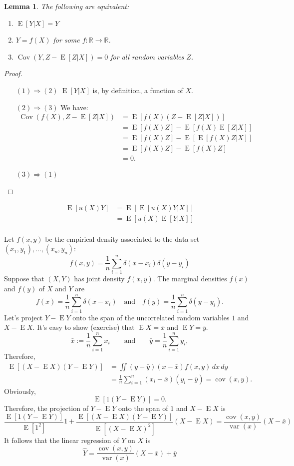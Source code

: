\documentclass[12pt]{amsart}
\renewcommand{\hat}{\widehat}
\newcommand{\RR}{\mathbb{R}}
\DeclareMathOperator{\EE}{E}
\DeclareMathOperator{\Cov}{Cov}
\DeclareMathOperator{\cov}{cov}
\DeclareMathOperator{\var}{var}
\newtheorem{lemma}[theorem]{Lemma}
\begin{document}
\begin{lemma}
    The following are equivalent:
    \begin{enumerate}
        \setlength{\itemsep}{1em}
        \item $\EE[Y|X]=Y$
        \item $Y=f(X)$ for some $f:\RR\to\RR$.
        \item $\Cov(Y, Z-\EE[Z|X])=0$ for all random variables $Z$.
    \end{enumerate}
\end{lemma}
\begin{proof}\hfill
    \begin{enumerate}
        \item[$(1)\Rightarrow(2)$] $\EE[Y|X]$ is, by definition, a function of $X$.
        \item[$(2)\Rightarrow(3)$] We have:
        \begin{align*}
            \Cov(f(X), Z-\EE[Z|X])
            &= \EE[f(X)(Z-\EE[Z|X])]\\
            &= \EE[f(X)Z] - \EE[f(X)\EE[Z|X]]\\
            &= \EE[f(X)Z] - \EE[\EE[f(X)Z|X]]\\
            &= \EE[f(X)Z] - \EE[f(X)Z]\\
            &= 0.
        \end{align*}
        \item[$(3)\Rightarrow(1)$] 
    \end{enumerate}
\end{proof}


\begin{align*}
    \EE[u(X)Y] &= \EE[\EE[u(X)Y|X]]\\
    &=\EE[u(X)\EE[Y|X]]\\
\end{align*}

Let $f(x,y)$ be the empirical density associated to the data set 
$(x_1,y_1),\ldots,(x_n, y_n)$:
\[
    f(x,y) = \frac1n\sum_{i=1}^n \delta(x - x_i)\delta(y - y_i)
\]
Suppose that $(X,Y)$ has joint density $f(x,y)$.
The marginal densities $f(x)$ and $f(y)$ of $X$ and $Y$ are
\[
    f(x) =  \frac1n\sum_{i=1}^n\delta(x - x_i)\quad\text{and}\quad
f(y) = \frac1n\sum_{i=1}^n\delta(y - y_i).
\]
Let's project $Y-\EE Y$ onto the span of the uncorrelated random variables $1$ and $X-\EE X$.
It's easy to show (exercise) that $\EE X=\bar x$ and $\EE Y = \bar y$.
\[
    \bar x := \frac1n\sum_{i=1}^n x_i\qquad\text{and}\qquad
    \bar y = \frac1n\sum_{i=1}^n y_i,
\]
Therefore,
\begin{align*}
    \EE[(X - \EE X)(Y - \EE Y)] &= \iint (y-\bar y)(x - \bar x)f(x,y)\,dx\,dy\\
    &= \frac1n\sum_{i=1}^n(x_i - \bar x)(y_i - \bar y) = \cov(x, y).
\end{align*}
Obviously,
\[
    \EE[1(Y-\EE Y)] = 0.
\]
Therefore, the projection of $Y - \EE Y$ onto the span of $1$ and $X - \EE X$ is
\[\frac{\EE[1(Y - \EE Y)]}{\EE[1^2]} 1 + \frac{\EE[(X-\EE X)(Y - \EE Y)]}{\EE[(X-\EE X)^2]}(X - \EE X) = \frac{\cov(x,y)}{\var(x)}(X-\bar x)\]
It follows that the linear regression of $Y$ on $X$ is
\[
\hat Y = \frac{\cov(x,y)}{\var(x)}(X-\bar x) + \bar y
\]
\end{document}
